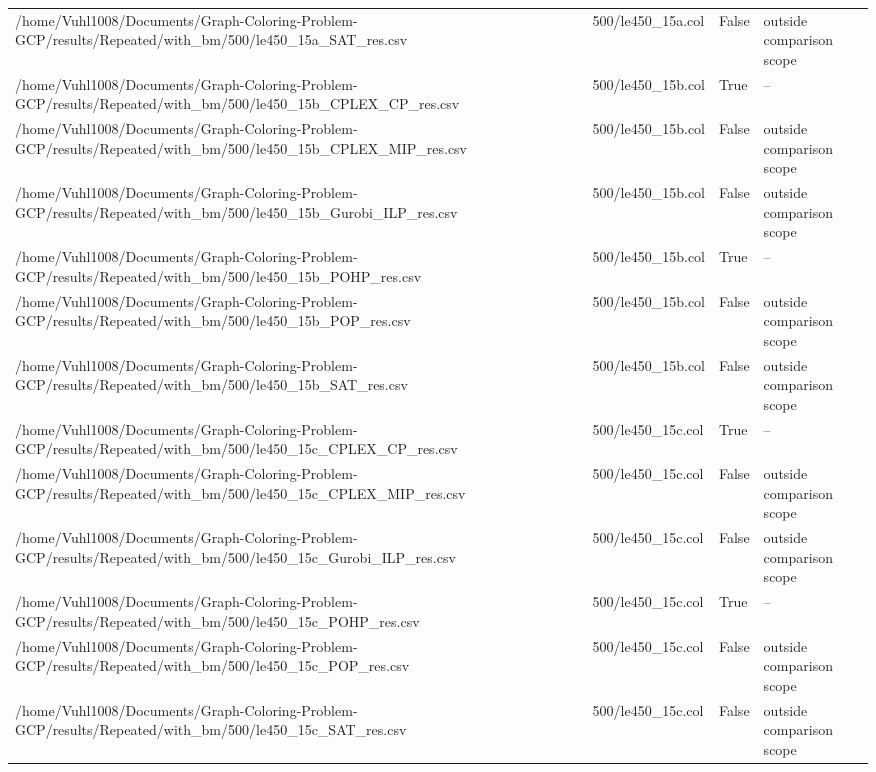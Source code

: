 \begin{table}[htbp]
\begin{tabular}{llll}
/home/Vuhl1008/Documents/Graph-Coloring-Problem-GCP/results/Repeated/with\_bm/500/le450\_15a\_SAT\_res.csv & 500/le450\_15a.col & False & outside comparison scope \\
/home/Vuhl1008/Documents/Graph-Coloring-Problem-GCP/results/Repeated/with\_bm/500/le450\_15b\_CPLEX\_CP\_res.csv & 500/le450\_15b.col & True & -- \\
/home/Vuhl1008/Documents/Graph-Coloring-Problem-GCP/results/Repeated/with\_bm/500/le450\_15b\_CPLEX\_MIP\_res.csv & 500/le450\_15b.col & False & outside comparison scope \\
/home/Vuhl1008/Documents/Graph-Coloring-Problem-GCP/results/Repeated/with\_bm/500/le450\_15b\_Gurobi\_ILP\_res.csv & 500/le450\_15b.col & False & outside comparison scope \\
/home/Vuhl1008/Documents/Graph-Coloring-Problem-GCP/results/Repeated/with\_bm/500/le450\_15b\_POHP\_res.csv & 500/le450\_15b.col & True & -- \\
/home/Vuhl1008/Documents/Graph-Coloring-Problem-GCP/results/Repeated/with\_bm/500/le450\_15b\_POP\_res.csv & 500/le450\_15b.col & False & outside comparison scope \\
/home/Vuhl1008/Documents/Graph-Coloring-Problem-GCP/results/Repeated/with\_bm/500/le450\_15b\_SAT\_res.csv & 500/le450\_15b.col & False & outside comparison scope \\
/home/Vuhl1008/Documents/Graph-Coloring-Problem-GCP/results/Repeated/with\_bm/500/le450\_15c\_CPLEX\_CP\_res.csv & 500/le450\_15c.col & True & -- \\
/home/Vuhl1008/Documents/Graph-Coloring-Problem-GCP/results/Repeated/with\_bm/500/le450\_15c\_CPLEX\_MIP\_res.csv & 500/le450\_15c.col & False & outside comparison scope \\
/home/Vuhl1008/Documents/Graph-Coloring-Problem-GCP/results/Repeated/with\_bm/500/le450\_15c\_Gurobi\_ILP\_res.csv & 500/le450\_15c.col & False & outside comparison scope \\
/home/Vuhl1008/Documents/Graph-Coloring-Problem-GCP/results/Repeated/with\_bm/500/le450\_15c\_POHP\_res.csv & 500/le450\_15c.col & True & -- \\
/home/Vuhl1008/Documents/Graph-Coloring-Problem-GCP/results/Repeated/with\_bm/500/le450\_15c\_POP\_res.csv & 500/le450\_15c.col & False & outside comparison scope \\
/home/Vuhl1008/Documents/Graph-Coloring-Problem-GCP/results/Repeated/with\_bm/500/le450\_15c\_SAT\_res.csv & 500/le450\_15c.col & False & outside comparison scope \\

\end{tabular}
\end{table}
